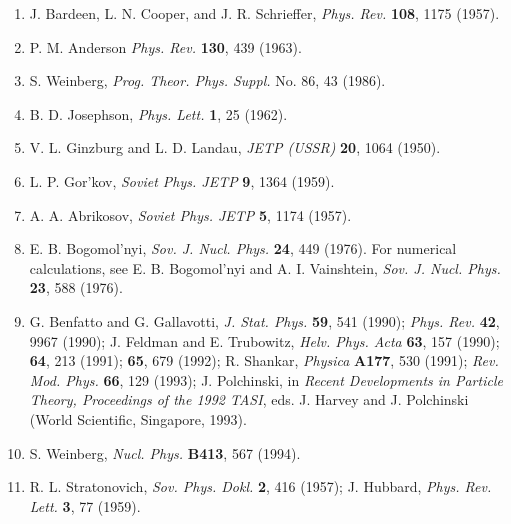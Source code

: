 \begin{enumerate}
\item {}\label{ch21-ref-37}
J. Bardeen, L. N. Cooper, and J. R. Schrieffer, \emph{Phys. Rev.}
\textbf{108}, 1175 (1957).

\item {}\label{ch21-ref-38}
P. M. Anderson \emph{Phys. Rev.} \textbf{130}, 439 (1963).

\item {}\label{ch21-ref-39}
S. Weinberg, \emph{Prog. Theor. Phys. Suppl.} No. 86, 43 (1986).

\item {}\label{ch21-ref-40}
B. D. Josephson, \emph{Phys. Lett.} \textbf{1}, 25 (1962).

\item {}\label{ch21-ref-41}
V. L. Ginzburg and L. D. Landau, \emph{JETP (USSR)} \textbf{20}, 1064
(1950).

\item {}\label{ch21-ref-42}
L. P. Gor'kov, \emph{Soviet Phys. JETP} \textbf{9}, 1364 (1959).

\item {}\label{ch21-ref-43}
A. A. Abrikosov, \emph{Soviet Phys. JETP} \textbf{5}, 1174 (1957).

\item[43a.] \label{ch21-ref-43a}
E. B. Bogomol'nyi, \emph{Sov. J. Nucl. Phys.} \textbf{24}, 449 (1976).
For numerical calculations, see E. B. Bogomol'nyi and A. I. Vainshtein,
\emph{Sov. J. Nucl. Phys.} \textbf{23}, 588 (1976).

\item {}\label{ch21-ref-44}
G. Benfatto and G. Gallavotti, \emph{J. Stat. Phys.} \textbf{59}, 541
(1990); \emph{Phys. Rev.} \textbf{42}, 9967 (1990); J. Feldman and
E. Trubowitz, \emph{Helv. Phys. Acta} \textbf{63}, 157 (1990);
\textbf{64}, 213 (1991); \textbf{65}, 679 (1992); R. Shankar,
\emph{Physica} \textbf{A177}, 530 (1991); \emph{Rev. Mod. Phys.}
\textbf{66}, 129 (1993); J. Polchinski, in \emph{Recent Developments in
Particle Theory, Proceedings of the 1992 TASI}, eds. J. Harvey and
J. Polchinski (World Scientific, Singapore, 1993).

\item[44a.] \label{ch21-ref-44a}
S. Weinberg, \emph{Nucl. Phys.} \textbf{B413}, 567 (1994).

\item {}\label{ch21-ref-45}
R. L. Stratonovich, \emph{Sov. Phys. Dokl.} \textbf{2}, 416 (1957);
J. Hubbard, \emph{Phys. Rev. Lett.} \textbf{3}, 77 (1959).


\end{enumerate}
